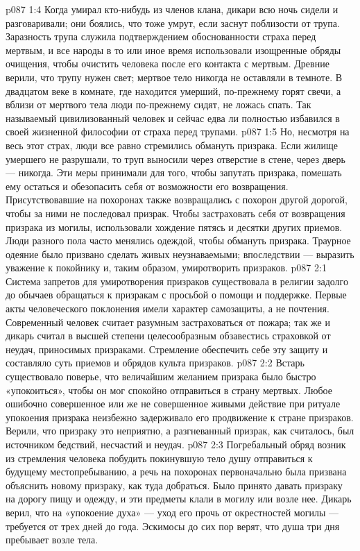 \vs p087 1:4 Когда умирал кто\hyp{}нибудь из членов клана, дикари всю ночь сидели и разговаривали; они боялись, что тоже умрут, если заснут поблизости от трупа. Заразность трупа служила подтверждением обоснованности страха перед мертвым, и все народы в то или иное время использовали изощренные обряды очищения, чтобы очистить человека после его контакта с мертвым. Древние верили, что трупу нужен свет; мертвое тело никогда не оставляли в темноте. В двадцатом веке в комнате, где находится умерший, по\hyp{}прежнему горят свечи, а вблизи от мертвого тела люди по\hyp{}прежнему сидят, не ложась спать. Так называемый цивилизованный человек и сейчас едва ли полностью избавился в своей жизненной философии от страха перед трупами.
\vs p087 1:5 Но, несмотря на весь этот страх, люди все равно стремились обмануть призрака. Если жилище умершего не разрушали, то труп выносили через отверстие в стене, через дверь --- никогда. Эти меры принимали для того, чтобы запутать призрака, помешать ему остаться и обезопасить себя от возможности его возвращения. Присутствовавшие на похоронах также возвращались с похорон другой дорогой, чтобы за ними не последовал призрак. Чтобы застраховать себя от возвращения призрака из могилы, использовали хождение пятясь и десятки других приемов. Люди разного пола часто менялись одеждой, чтобы обмануть призрака. Траурное одеяние было призвано сделать живых неузнаваемыми; впоследствии --- выразить уважение к покойнику и, таким образом, умиротворить призраков.
\vs p087 2:1 Система запретов для умиротворения призраков существовала в религии задолго до обычаев обращаться к призракам с просьбой о помощи и поддержке. Первые акты человеческого поклонения имели характер самозащиты, а не почтения. Современный человек считает разумным застраховаться от пожара; так же и дикарь считал в высшей степени целесообразным обзавестись страховкой от неудач, приносимых призраками. Стремление обеспечить себе эту защиту и составляло суть приемов и обрядов культа призраков.
\vs p087 2:2 \pc Встарь существовало поверье, что величайшим желанием призрака было быстро «упокоиться», чтобы он мог спокойно отправиться в страну мертвых. Любое ошибочно совершенное или же не совершенное живыми действие при ритуале упокоения призрака неизбежно задерживало его продвижение к стране призраков. Верили, что призраку это неприятно, а разгневанный призрак, как считалось, был источником бедствий, несчастий и неудач.
\vs p087 2:3 Погребальный обряд возник из стремления человека побудить покинувшую тело душу отправиться к будущему местопребыванию, а речь на похоронах первоначально была призвана объяснить новому призраку, как туда добраться. Было принято давать призраку на дорогу пищу и одежду, и эти предметы клали в могилу или возле нее. Дикарь верил, что на «упокоение духа» --- уход его прочь от окрестностей могилы --- требуется от трех дней до года. Эскимосы до сих пор верят, что душа три дня пребывает возле тела.
